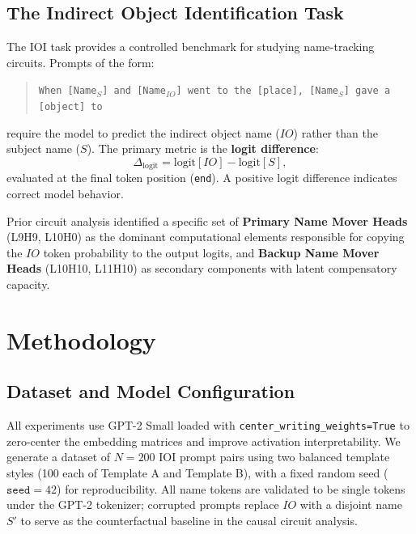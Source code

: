 \documentclass[12pt,a4paper]{article}
\begin{document}
\subsection{The Indirect Object Identification Task}
\label{subsec:ioi}

The IOI task \citep{wang2022interpretability} provides a controlled benchmark
for studying name-tracking circuits. Prompts of the form:
\begin{quote}
  \texttt{When [Name$_S$] and [Name$_{IO}$] went to the [place],
  [Name$_S$] gave a [object] to}
\end{quote}
require the model to predict the indirect object name ($IO$) rather than the
subject name ($S$). The primary metric is the \textbf{logit difference}:
\begin{equation}
  \Delta_{\text{logit}} = \text{logit}[IO] - \text{logit}[S],
  \label{eq:logitdiff}
\end{equation}
evaluated at the final token position (\texttt{end}). A positive logit
difference indicates correct model behavior.

Prior circuit analysis \citep{wang2022interpretability} identified a specific
set of \textbf{Primary Name Mover Heads} (L9H9, L10H0) as the dominant
computational elements responsible for copying the $IO$ token probability to
the output logits, and \textbf{Backup Name Mover Heads} (L10H10, L11H10) as
secondary components with latent compensatory capacity.

\section{Methodology}
\label{sec:method}

\subsection{Dataset and Model Configuration}
\label{subsec:dataset}

All experiments use GPT-2 Small loaded with \texttt{center\_writing\_weights=True}
to zero-center the embedding matrices and improve activation interpretability.
We generate a dataset of $N=200$ IOI prompt pairs using two balanced template
styles (100 each of Template A and Template B), with a fixed random seed
($\texttt{seed}=42$) for reproducibility. All name tokens are validated to be
single tokens under the GPT-2 tokenizer; corrupted prompts replace $IO$ with
a disjoint name $S'$ to serve as the counterfactual baseline in the causal
circuit analysis.
\end{document}
